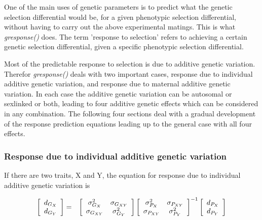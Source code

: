 \documentclass[titlepage]{article}  %
\begin{document}
One of the main uses of genetic parameters is to predict what the genetic selection differential would be, for a given phenotypic selection differential, without having to carry out the above experimental matings. This is what {\em gresponse()} does. The term 'response to selection' refers to achieving a certain genetic selection differential, given a specific phenotypic selection differential.

Most of the predictable response to selection is due to additive genetic variation. Therefor {\em gresponse()} deals with two important cases, response due to individual additive genetic variation, and response due to maternal additive genetic variation.   In each case the additive genetic variation can be autosomal or sexlinked or both, leading to four additive genetic effects which can be considered in any combination. The following four sections deal with a gradual development of the response prediction equations leading up to the general case with all four effects.

\subsubsection{Response due to individual additive genetic variation}
If there are two traits, X and Y, the equation for response due to individual additive genetic variation is

\begin{eqnarray*}
 \left[ \begin{array}{c}
 d_{G_{X}} \\
 d_{G_{Y}}
\end{array} \right] 
 & = &
 \left[ \begin{array}{c c}
 \sigma^{2}_{G_{X}} & \sigma_{G_{XY}} \\
 \sigma_{G_{XY}} & \sigma^{2}_{G_{Y}}
\end{array} \right] 
\left[ \begin{array}{cc}
 \sigma^{2}_{P_{X}} & \sigma_{P_{XY}} \\
 \sigma_{P_{XY}} & \sigma^{2}_{P_{Y}}
\end{array} \right] ^{-1}
 \left[ \begin{array}{c}
 d_{P_{X}} \\
 d_{P_{Y}}
\end{array} \right]
\end{eqnarray*}
\end{document}
